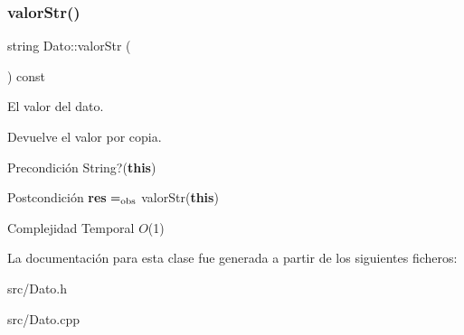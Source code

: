 \subsubsection{\texorpdfstring{valor\+Str()}{valorStr()}}
{\footnotesize\ttfamily string Dato\+::valor\+Str (\begin{DoxyParamCaption}{ }\end{DoxyParamCaption}) const}



El valor del dato. 

Devuelve el valor por copia.

\begin{DoxyPrecond}{Precondición}
String?({\bfseries this}) 
\end{DoxyPrecond}
\begin{DoxyPostcond}{Postcondición}
{\bfseries res} $=_{\rm obs}$ valor\+Str({\bfseries this}) 
\begin{DoxyDescription}
\item[Complejidad Temporal]$O$(1)
\end{DoxyDescription}
\end{DoxyPostcond}


La documentación para esta clase fue generada a partir de los siguientes ficheros\+:\begin{DoxyCompactItemize}
\item 
src/Dato.\+h\item 
src/Dato.\+cpp\end{DoxyCompactItemize}

